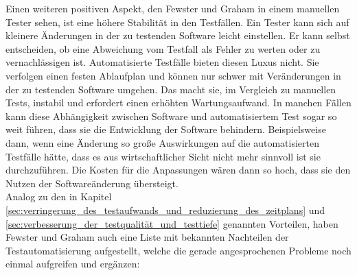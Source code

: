 Einen weiteren positiven Aspekt, den Fewster und Graham \cite[vgl. S. 24 ff.]{fewster_software_1999} in einem manuellen Tester sehen, ist eine höhere Stabilität in den Testfällen. Ein Tester kann sich auf kleinere Änderungen in der zu testenden Software leicht einstellen. Er kann selbst entscheiden, ob eine Abweichung vom Testfall als Fehler zu werten oder zu vernachlässigen ist. Automatisierte Testfälle bieten diesen Luxus nicht. Sie verfolgen einen festen Ablaufplan und können nur schwer mit Veränderungen in der zu testenden Software umgehen. Das macht sie, im Vergleich zu manuellen Tests, instabil und erfordert einen erhöhten Wartungsaufwand. In manchen Fällen kann diese Abhängigkeit zwischen Software und automatisiertem Test sogar so weit führen, dass sie die Entwicklung der Software behindern. Beispielsweise dann, wenn eine Änderung so große Auswirkungen auf die automatisierten Testfälle hätte, dass es aus wirtschaftlicher Sicht nicht mehr sinnvoll ist sie durchzuführen. Die Kosten für die Anpassungen wären dann so hoch, dass sie den Nutzen der Softwareänderung übersteigt.\\
Analog zu den in Kapitel \ref{sec:verringerung_des_testaufwands_und_reduzierung_des_zeitplans} und \ref{sec:verbesserung_der_testqualität_und_testtiefe} genannten Vorteilen, haben Fewster und Graham \cite[vgl. S. 10 ff.]{fewster_software_1999} auch eine Liste mit bekannten Nachteilen der Testautomatisierung aufgestellt, welche die gerade angesprochenen Probleme noch einmal aufgreifen und ergänzen:

